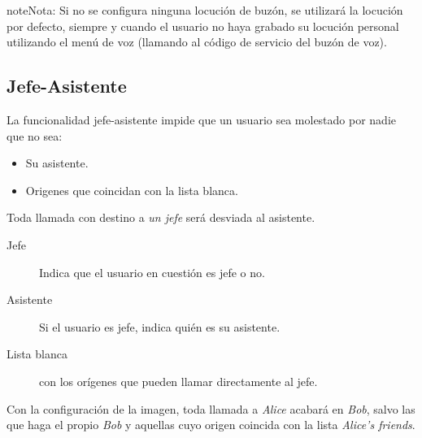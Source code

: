 \documentclass[letterpaper,10pt,spanish]{sphinxmanual}
\begin{document}
\begin{notice}{note}{Nota:}
Si no se configura ninguna locución de buzón, se utilizará la locución por defecto, siempre y cuando el usuario no haya grabado su locución personal utilizando el menú de voz (llamando al código de servicio del buzón de voz).
\end{notice}


\subsection{Jefe-Asistente}
\label{pbx_features/users:boss-assistant}

La funcionalidad jefe-asistente impide que un usuario sea molestado por nadie que no sea:
\begin{itemize}
\item {} 
Su asistente.

\item {} 
Origenes que coincidan con la lista blanca.

\end{itemize}

Toda llamada con destino a \emph{un jefe} será desviada al asistente.
\begin{description}
\item[{Jefe}] \leavevmode{}\label{pbx_features/users:term-is-boss}
Indica que el usuario en cuestión es jefe o no.

\item[{Asistente}] \leavevmode{}\label{pbx_features/users:term-assistant}
Si el usuario es jefe, indica quién es su asistente.

\item[{Lista blanca}] \leavevmode{}\label{pbx_features/users:term-whitelist}
{\hyperref[pbx_features/match_lists:match\string-lists]{}} con los orígenes que pueden llamar directamente al jefe.

\end{description}

Con la configuración de la imagen, toda llamada a \emph{Alice} acabará en \emph{Bob}, salvo las que haga el propio \emph{Bob} y aquellas cuyo origen coincida con la lista \emph{Alice's friends}.
\end{document}
